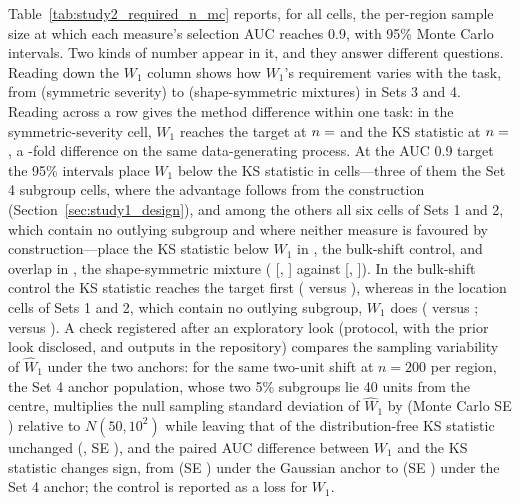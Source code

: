 \documentclass[AMA,Times1COL]{WileyNJDv5}
\begin{document}
Table~\ref{tab:study2_required_n_mc} reports, for all  cells, the per-region sample size at which each measure's selection AUC reaches 0.9, with 95\% Monte Carlo intervals. Two kinds of number appear in it, and they answer different questions. Reading down the $W_1$ column shows how $W_1$'s requirement varies with the task, from  (symmetric severity) to  (shape-symmetric mixtures) in Sets 3 and 4. Reading across a row gives the method difference within one task: in the symmetric-severity cell, $W_1$ reaches the target at $n = \numval{reqnW1Set4symsevB}$ and the KS statistic at $n = \numval{reqnKSSet4symsev}$, a -fold difference on the same data-generating process. At the AUC 0.9 target the 95\% intervals place $W_1$ below the KS statistic in  cells---three of them the Set 4 subgroup cells, where the advantage follows from the construction (Section~\ref{sec:study1_design}), and among the others all six cells of Sets 1 and 2, which contain no outlying subgroup and where neither measure is favoured by construction---place the KS statistic below $W_1$ in , the bulk-shift control, and overlap in , the shape-symmetric mixture ( [, ] against  [, ]). In the bulk-shift control the KS statistic reaches the target first ( versus ), whereas in the location cells of Sets 1 and 2, which contain no outlying subgroup, $W_1$ does ( versus ;  versus ). A check registered after an exploratory look (protocol, with the prior look disclosed, and outputs in the repository) compares the sampling variability of $\widehat{W}_1$ under the two anchors: for the same two-unit shift at $n = 200$ per region, the Set 4 anchor population, whose two 5\% subgroups lie 40 units from the centre, multiplies the null sampling standard deviation of $\widehat{W}_1$ by  (Monte Carlo SE ) relative to $N(50, 10^2)$ while leaving that of the distribution-free KS statistic unchanged (, SE ), and the paired AUC difference between $W_1$ and the KS statistic changes sign, from  (SE ) under the Gaussian anchor to  (SE ) under the Set 4 anchor; the control is reported as a loss for $W_1$.
\end{document}
